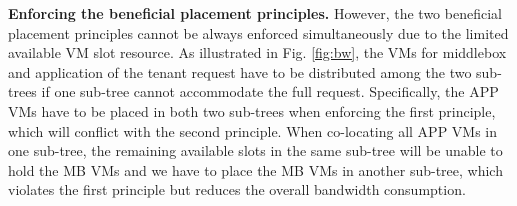 \documentclass[review]{elsarticle}
\begin{document}
\textbf{Enforcing the beneficial placement principles.} However, the two beneficial placement principles cannot be always enforced simultaneously due to the limited available VM slot resource. 
As illustrated in Fig. \ref{fig:bw}, the VMs for middlebox and application of the tenant request have to be distributed among the two sub-trees if one sub-tree cannot accommodate the full request. Specifically, the APP VMs have to be placed in both two sub-trees when enforcing the first principle, which will conflict with the second principle. When co-locating all APP VMs in one sub-tree, the remaining available slots in the same sub-tree will be unable to hold the MB VMs and we have to place the MB VMs in another sub-tree, which violates the first principle but reduces the overall bandwidth consumption. 
\end{document}
